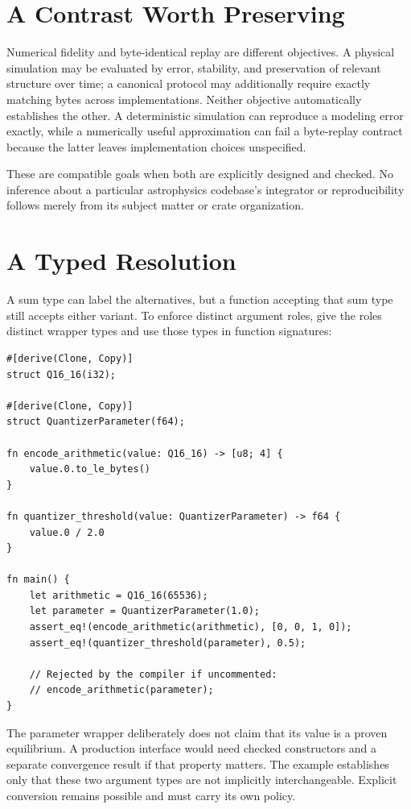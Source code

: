 \documentclass[11pt]{article}
\begin{document}
\section{A Contrast Worth Preserving}

Numerical fidelity and byte-identical replay are different objectives. A physical simulation may be evaluated by error, stability, and preservation of relevant structure over time; a canonical protocol may additionally require exactly matching bytes across implementations. Neither objective automatically establishes the other. A deterministic simulation can reproduce a modeling error exactly, while a numerically useful approximation can fail a byte-replay contract because the latter leaves implementation choices unspecified.

These are compatible goals when both are explicitly designed and checked. No inference about a particular astrophysics codebase's integrator or reproducibility follows merely from its subject matter or crate organization.

\clearpage
\section{A Typed Resolution}

A sum type can label the alternatives, but a function accepting that sum type still accepts either variant. To enforce distinct argument roles, give the roles distinct wrapper types and use those types in function signatures:

\begin{lstlisting}
#[derive(Clone, Copy)]
struct Q16_16(i32);

#[derive(Clone, Copy)]
struct QuantizerParameter(f64);

fn encode_arithmetic(value: Q16_16) -> [u8; 4] {
    value.0.to_le_bytes()
}

fn quantizer_threshold(value: QuantizerParameter) -> f64 {
    value.0 / 2.0
}

fn main() {
    let arithmetic = Q16_16(65536);
    let parameter = QuantizerParameter(1.0);
    assert_eq!(encode_arithmetic(arithmetic), [0, 0, 1, 0]);
    assert_eq!(quantizer_threshold(parameter), 0.5);

    // Rejected by the compiler if uncommented:
    // encode_arithmetic(parameter);
}
\end{lstlisting}

The parameter wrapper deliberately does not claim that its value is a proven equilibrium. A production interface would need checked constructors and a separate convergence result if that property matters. The example establishes only that these two argument types are not implicitly interchangeable. Explicit conversion remains possible and must carry its own policy.
\end{document}
